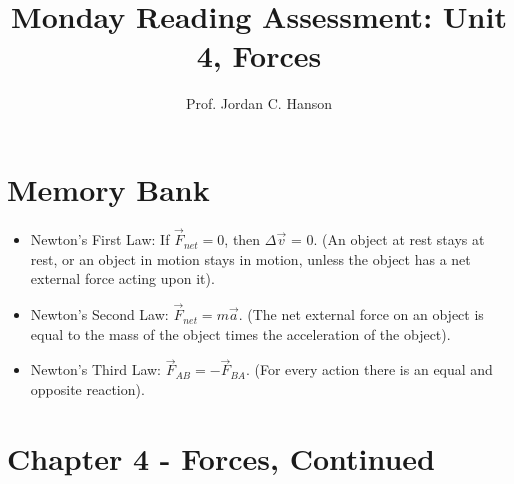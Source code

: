 \documentclass{article}
\begin{document}
\title{Monday Reading Assessment: Unit 4, Forces}
\author{Prof. Jordan C. Hanson}

\maketitle

\section{Memory Bank}

\begin{itemize}
\item Newton's First Law: If $\vec{F}_{net} = 0$, then $\Delta\vec{v}$ = 0.  (An object at rest stays at rest, or an object in motion stays in motion, unless the object has a net external force acting upon it).
\item Newton's Second Law: $\vec{F}_{net} = m\vec{a}$. (The net external force on an object is equal to the mass of the object times the acceleration of the object).
\item Newton's Third Law: $\vec{F}_{AB} = -\vec{F}_{BA}$. (For every action there is an equal and opposite reaction).
\end{itemize}

\section{Chapter 4 - Forces, Continued}
\end{document}
